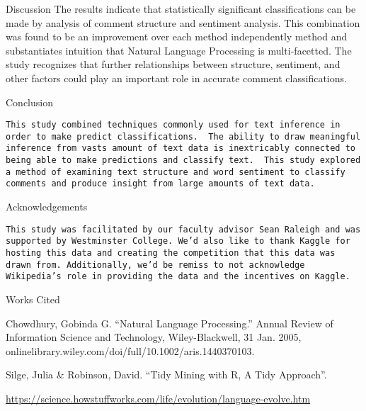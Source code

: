 \documentclass[]{article}
\begin{document}
Discussion The results indicate that statistically significant
classifications can be made by analysis of comment structure and
sentiment analysis. This combination was found to be an improvement over
each method independently method and substantiates intuition that
Natural Language Processing is multi-facetted. The study recognizes that
further relationships between structure, sentiment, and other factors
could play an important role in accurate comment classifications.

Conclusion

\begin{verbatim}
This study combined techniques commonly used for text inference in order to make predict classifications.  The ability to draw meaningful inference from vasts amount of text data is inextricably connected to being able to make predictions and classify text.  This study explored a method of examining text structure and word sentiment to classify comments and produce insight from large amounts of text data.
\end{verbatim}

Acknowledgements

\begin{verbatim}
This study was facilitated by our faculty advisor Sean Raleigh and was supported by Westminster College. We’d also like to thank Kaggle for hosting this data and creating the competition that this data was drawn from. Additionally, we’d be remiss to not acknowledge Wikipedia’s role in providing the data and the incentives on Kaggle.
\end{verbatim}

Works Cited

Chowdhury, Gobinda G. ``Natural Language Processing.'' Annual Review of
Information Science and Technology, Wiley-Blackwell, 31 Jan. 2005,
onlinelibrary.wiley.com/doi/full/10.1002/aris.1440370103.

Silge, Julia \& Robinson, David. ``Tidy Mining with R, A Tidy
Approach''.

\url{https://science.howstuffworks.com/life/evolution/language-evolve.htm}
\end{document}
